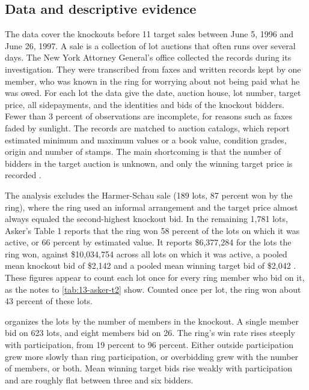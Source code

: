 \subsection{Data and descriptive evidence}\label{sec:13-asker-data}

The data cover the knockouts before 11 target sales between June 5, 1996 and June 26, 1997. A sale is a
collection of lot auctions that often runs over several days. The New York Attorney General's office collected
the records during its investigation. They were transcribed from faxes and written records kept by one member,
who was known in the ring for worrying about not being paid what he was owed. For each lot the data give the
date, auction house, lot number, target price, all sidepayments, and the identities and bids of the knockout
bidders. Fewer than 3 percent of observations are incomplete, for reasons such as faxes faded by sunlight. The
records are matched to auction catalogs, which report estimated minimum and maximum values or a book value,
condition grades, origin and number of stamps. The main shortcoming is that the number of bidders in the target
auction is unknown, and only the winning target price is recorded \citep[pp.~734--735]{Asker2010}.

The analysis excludes the Harmer-Schau sale (189 lots, 87 percent won by the ring), where the ring used an
informal arrangement and the target price almost always equaled the second-highest knockout bid. In the
remaining 1,781 lots, Asker's Table 1 reports that the ring won 58 percent of the lots on which it was active, or
66 percent by estimated value. It reports \$6,377,284 for the lots the ring won, against \$10,034,754 across all
lots on which it was active, a pooled mean knockout bid of \$2,142 and a pooled mean winning target bid of \$2,042
\citep[Table 1]{Asker2010}. These figures appear to count each lot once for every ring member who bid on it, as the
notes to \cref{tab:13-asker-t2} show. Counted once per lot, the ring won about 43 percent of these lots.

 organizes the lots by the number of members in the knockout. A single member bid on
623 lots, and eight members bid on 26. The ring's win rate rises steeply with participation, from 19 percent to
96 percent. Either outside participation grew more slowly than ring participation, or overbidding grew with the
number of members, or both. Mean winning target bids rise weakly with participation and are roughly flat between
three and six bidders.

